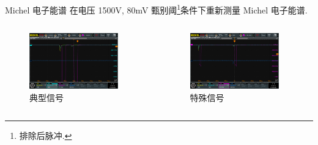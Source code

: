 \documentclass[10pt]{beamer}
\begin{document}
\begin{frame}[label={sec:orgde237ab}]{Michel 电子能谱}
在电压 1500V, 80mV 甄别阈\footnote{排除后脉冲.}条件下重新测量 Michel 电子能谱.
\begin{columns}
\begin{column}{0.5\columnwidth}
\begin{figure}[htbp]
\centering
\includegraphics[width=0.9\textwidth]{../../ExperimentData/michel/michel/mudecay0.png}
\caption{典型信号}
\end{figure}
\end{column}

\begin{column}{0.5\columnwidth}
\begin{figure}[htbp]
\centering
\includegraphics[width=0.9\textwidth]{../../ExperimentData/michel/michel/mudecay1.png}
\caption{特殊信号}
\end{figure}
\end{column}
\end{columns}
\end{frame}
\end{document}
